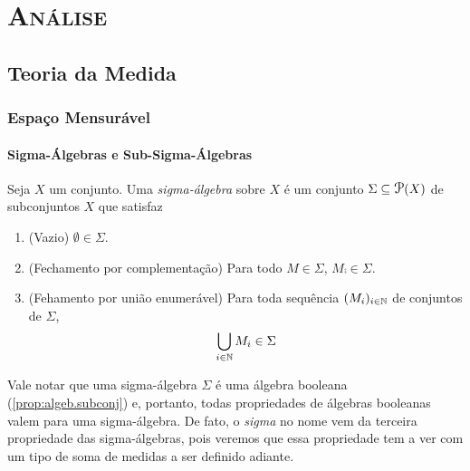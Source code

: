 \part{{\scshape Análise}}

\chapter{Teoria da Medida}

\section{Espaço Mensurável}

\subsection{Sigma-Álgebras e Sub-Sigma-Álgebras}

\begin{defi}
	Seja $X$ um conjunto. Uma \emph{sigma-álgebra} sobre $X$ é um conjunto $\Sigma \subseteq \p(X)$ de subconjuntos $X$ que satisfaz
	\begin{enumerate}
	\item (Vazio) $\emptyset \in \Sigma$.
	\item (Fechamento por complementação) Para todo $M \in \Sigma$, $M\comp \in \Sigma$.
	\item (Fehamento por união enumerável) Para toda sequência $(M_i)_{i \in \mathbb{N}}$ de conjuntos de $\Sigma$,
	\begin{equation*}
	\bigcup_{i \in \mathbb{N}} M_i \in \Sigma
	\end{equation*}
	\end{enumerate}
\end{defi}

	Vale notar que uma sigma-álgebra $\Sigma$ é uma álgebra booleana (\ref{prop:algeb.subconj}) e, portanto, todas propriedades de álgebras booleanas valem para uma sigma-álgebra. De fato, o \textit{sigma} no nome vem da terceira propriedade das sigma-álgebras, pois veremos que essa propriedade tem a ver com um tipo de soma de medidas a ser definido adiante.

